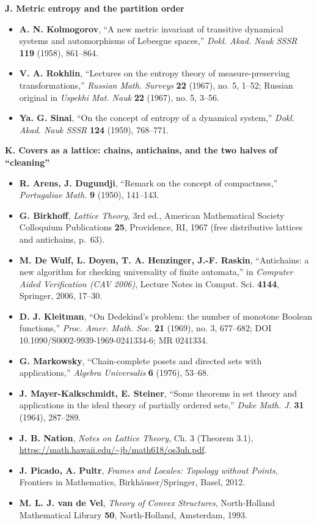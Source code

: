 \documentclass[
]{article}
\providecommand{\tightlist}{%
  \setlength{\itemsep}{0pt}\setlength{\parskip}{0pt}}
\begin{document}
\textbf{J. Metric entropy and the partition order}

\begin{itemize}
\tightlist
\item
  \textbf{A. N. Kolmogorov}, ``A new metric invariant of transitive
  dynamical systems and automorphisms of Lebesgue spaces,'' \emph{Dokl.
  Akad. Nauk SSSR} \textbf{119} (1958), 861--864.
\item
  \textbf{V. A. Rokhlin}, ``Lectures on the entropy theory of
  measure-preserving transformations,'' \emph{Russian Math. Surveys}
  \textbf{22} (1967), no. 5, 1--52; Russian original in \emph{Uspekhi
  Mat. Nauk} \textbf{22} (1967), no. 5, 3--56.
\item
  \textbf{Ya. G. Sinai}, ``On the concept of entropy of a dynamical
  system,'' \emph{Dokl. Akad. Nauk SSSR} \textbf{124} (1959), 768--771.
\end{itemize}

\textbf{K. Covers as a lattice: chains, antichains, and the two halves
of ``cleaning''}

\begin{itemize}
\tightlist
\item
  \textbf{R. Arens, J. Dugundji}, ``Remark on the concept of
  compactness,'' \emph{Portugaliae Math.} \textbf{9} (1950), 141--143.
\item
  \textbf{G. Birkhoff}, \emph{Lattice Theory}, 3rd ed., American
  Mathematical Society Colloquium Publications \textbf{25}, Providence,
  RI, 1967 (free distributive lattices and antichains, p.~63).
\item
  \textbf{M. De Wulf, L. Doyen, T. A. Henzinger, J.-F. Raskin},
  ``Antichains: a new algorithm for checking universality of finite
  automata,'' in \emph{Computer Aided Verification (CAV 2006)}, Lecture
  Notes in Comput. Sci. \textbf{4144}, Springer, 2006, 17--30.
\item
  \textbf{D. J. Kleitman}, ``On Dedekind's problem: the number of
  monotone Boolean functions,'' \emph{Proc. Amer. Math. Soc.}
  \textbf{21} (1969), no. 3, 677--682; DOI
  10.1090/S0002-9939-1969-0241334-6; MR 0241334.
\item
  \textbf{G. Markowsky}, ``Chain-complete posets and directed sets with
  applications,'' \emph{Algebra Universalis} \textbf{6} (1976), 53--68.
\item
  \textbf{J. Mayer-Kalkschmidt, E. Steiner}, ``Some theorems in set
  theory and applications in the ideal theory of partially ordered
  sets,'' \emph{Duke Math. J.} \textbf{31} (1964), 287--289.
\item
  \textbf{J. B. Nation}, \emph{Notes on Lattice Theory}, Ch. 3 (Theorem
  3.1),
  \url{https://math.hawaii.edu/~jb/math618/os3uh.pdf}.
\item
  \textbf{J. Picado, A. Pultr}, \emph{Frames and Locales: Topology
  without Points}, Frontiers in Mathematics, Birkh\"{a}user/Springer,
  Basel, 2012.
\item
  \textbf{M. L. J. van de Vel}, \emph{Theory of Convex Structures},
  North-Holland Mathematical Library \textbf{50}, North-Holland,
  Amsterdam, 1993.
\end{itemize}
\end{document}
